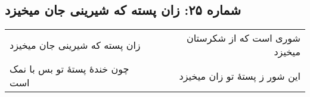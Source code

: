 \begin{center}
\section*{شماره ۲۵: زان پسته که شیرینی جان میخیزد}
\label{sec:025}
\begin{longtable}{l p{0.5cm} r}
زان پسته که شیرینی جان میخیزد
&&
شوری است که از شکرستان میخیزد
\\
چون خندهٔ پستهٔ تو بس با نمک است
&&
این شور ز پستهٔ تو زان میخیزد
\\
\end{longtable}
\end{center}
